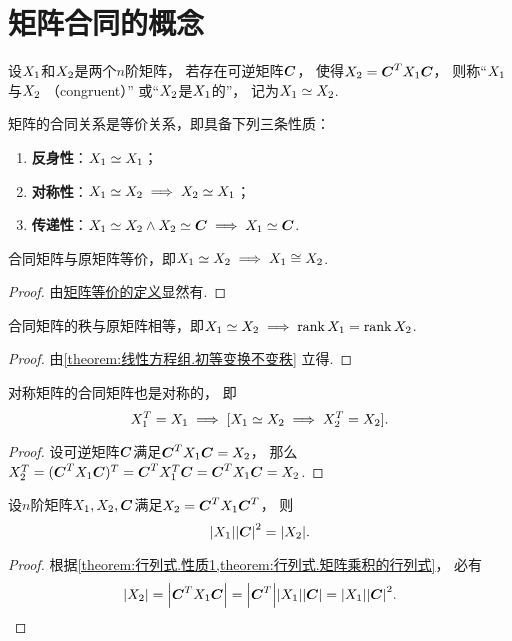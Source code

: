 \section{矩阵合同的概念}
\begin{definition}
设\(X_1\)和\(X_2\)是两个\(n\)阶矩阵，
若存在可逆矩阵\(\boldsymbol{C}\)，
使得\(X_2=\boldsymbol{C}^TX_1\boldsymbol{C}\)，
则称“\(X_1\)与\(X_2\) （congruent）”
或“\(X_2\)是\(X_1\)的”，
记为\(X_1\simeq X_2\).
\end{definition}

\begin{property}
矩阵的合同关系是等价关系，即具备下列三条性质：
\begin{enumerate}
	\item {\bf 反身性}：\(X_1\simeq X_1\)；
	\item {\bf 对称性}：\(X_1\simeq X_2 \implies X_2\simeq X_1\)；
	\item {\bf 传递性}：\(X_1\simeq X_2 \land X_2\simeq\boldsymbol{C} \implies X_1\simeq\boldsymbol{C}\).
\end{enumerate}
\end{property}

\begin{property}
合同矩阵与原矩阵等价，即\(X_1\simeq X_2 \implies X_1\cong X_2\).
\begin{proof}
由\hyperref[definition:逆矩阵.矩阵等价]{矩阵等价的定义}显然有.
\end{proof}
\end{property}

\begin{property}
合同矩阵的秩与原矩阵相等，即\(X_1\simeq X_2 \implies \rank X_1=\rank X_2\).
\begin{proof}
由\cref{theorem:线性方程组.初等变换不变秩} 立得.
\end{proof}
\end{property}

\begin{property}
对称矩阵的合同矩阵也是对称的，
即\[
	X_1^T = X_1
	\implies
	[X_1\simeq X_2 \implies X_2^T = X_2].
\]
\begin{proof}
设可逆矩阵\(\boldsymbol{C}\)满足\(\boldsymbol{C}^TX_1\boldsymbol{C}=X_2\)，
那么\(X_2^T = (\boldsymbol{C}^TX_1\boldsymbol{C})^T = \boldsymbol{C}^TX_1^T\boldsymbol{C} = \boldsymbol{C}^TX_1\boldsymbol{C} = X_2\).
\end{proof}
\end{property}

\begin{proposition}\label{theorem:矩阵合同.合同矩阵的行列式的关系}
设\(n\)阶矩阵\(X_1,X_2,\boldsymbol{C}\)满足\(X_2=\boldsymbol{C}^TX_1\boldsymbol{C}^T\)，
则\[
	\abs{X_1}\abs{\boldsymbol{C}}^2
	=\abs{X_2}.
\]
\begin{proof}
根据\cref{theorem:行列式.性质1,theorem:行列式.矩阵乘积的行列式}，
必有\[
	\abs{X_2}
	=\abs{\boldsymbol{C}^TX_1\boldsymbol{C}}
	=\abs{\boldsymbol{C}^T}\abs{X_1}\abs{\boldsymbol{C}}
	=\abs{X_1}\abs{\boldsymbol{C}}^2.
	\qedhere
\]
\end{proof}
\end{proposition}

